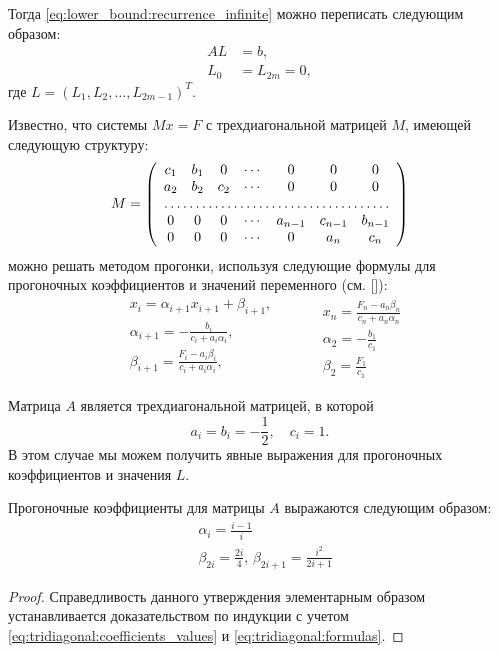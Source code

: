 Тогда \eqref{eq:lower_bound:recurrence_infinite} можно переписать следующим образом:
\[
\begin{aligned}
AL &= b, \\
L_0 &= L_{2m} = 0,
\end{aligned}
\]
где $ L = (L_1, L_2, \ldots, L_{2m-1})^T $.

Известно, что системы $ Mx = F $ с трехдиагональной матрицей $ M $, имеющей следующую структуру:
\[
M = \left(\begin{array}{ccccccc}
c_1 & b_1 & 0 & \cdots & 0 & 0 & 0 \\
a_2 & b_2 & c_2 & \cdots & 0 & 0 & 0 \\
\hdotsfor{7} \\
0 & 0 & 0 & \cdots & a_{n-1} & c_{n-1} & b_{n-1} \\
0 & 0 & 0 & \cdots & 0 & a_n & c_n
\end{array}\right)
\]
можно решать методом прогонки, используя следующие формулы для прогоночных коэффициентов и значений переменного (см. [\samarsky]):
\begin{equation}
\label{eq:tridiagonal:formulas}
\begin{split}
    &x_i = \alpha_{i+1} x_{i+1} + \beta_{i+1}, \\
    &\alpha_{i+1} = -\frac{b_i}{c_i + a_i\alpha_i}, \\
    &\beta_{i+1} = \frac{F_i - a_i\beta_i}{c_i + a_i\alpha_i}, \\
\end{split}
\qquad
\begin{split}
    &x_n = \frac{F_n - a_n\beta_n}{c_n + a_n\alpha_n} \\
    &\alpha_2 = -\frac{b_1}{c_1} \\
    &\beta_2 = \frac{F_1}{c_1}
\end{split}
\end{equation}

Матрица $ A $ является трехдиагональной матрицей, в которой 
\begin{equation}
\label{eq:tridiagonal:coefficients_values}
a_i = b_i = -\frac{1}{2}, \quad c_i = 1.
\end{equation}
В этом случае мы можем получить явные выражения для прогоночных коэффициентов и значения $ L $.

\begin{utver}
\label{utver:tridiagonal:coefficients}
Прогоночные коэффициенты для матрицы $ A $ выражаются следующим образом:
\begin{align}
\label{eq:tridiagonal:alpha}
&\alpha_i = \frac{i-1}{i} \\
\label{eq:tridiagonal:beta}
&\beta_{2i} = \frac{2i}{4}, \,
\beta_{2i+1} = \frac{i^2}{2i+1}
\end{align}
\end{utver}
\begin{proof}
Справедливость данного утверждения элементарным образом устанавливается доказательством по индукции с учетом \eqref{eq:tridiagonal:coefficients_values} и \eqref{eq:tridiagonal:formulas}.
\end{proof}

